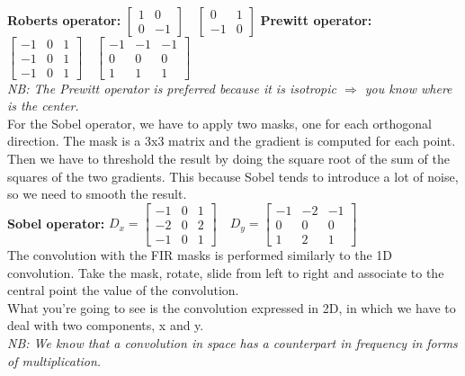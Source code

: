 \\
\textbf{Roberts operator:} $\begin{bmatrix} 1 & 0 \\ 0 & -1 \end{bmatrix} \quad \begin{bmatrix} 0 & 1 \\ -1 & 0 \end{bmatrix}$
\vspace{0.5cm} 
\textbf{Prewitt operator:} $\begin{bmatrix} -1 & 0 & 1 \\ -1 & 0 & 1 \\ -1 & 0 & 1 \end{bmatrix} \quad \begin{bmatrix} -1 & -1 & -1 \\ 0 & 0 & 0 \\ 1 & 1 & 1 \end{bmatrix}$
\\
\textit{NB: The Prewitt operator is preferred because it is isotropic $\Rightarrow$ you know where is the center.}
\\
For the Sobel operator, we have to apply two masks, one for each orthogonal direction. The mask is a 3x3 matrix and the gradient is computed for each point. Then we have to threshold the result by doing the square root of the sum of the squares of the two gradients.
This because Sobel tends to introduce a lot of noise, so we need to smooth the result.
\\\vspace{1cm} 
\textbf{Sobel operator:} $D_x=\begin{bmatrix} -1 & 0 & 1 \\ -2 & 0 & 2 \\ -1 & 0 & 1 \end{bmatrix} \quad D_y=\begin{bmatrix} -1 & -2 & -1 \\ 0 & 0 & 0 \\ 1 & 2 & 1 \end{bmatrix}$
\\
The convolution with the FIR masks is performed similarly to the 1D convolution. Take the mask, rotate, slide from left to right and associate to the central point the value of the convolution. 
\\What you're going to see is the convolution expressed in 2D, in which we have to deal with two components, x and y.
\\\textit{NB: We know that a convolution in space has a counterpart in frequency in forms of multiplication.}
